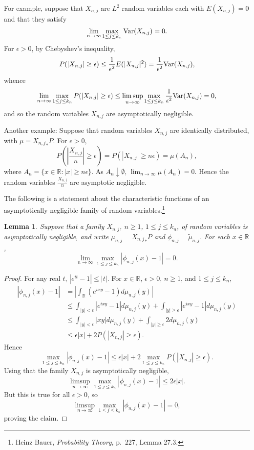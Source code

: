 \documentclass{article}
\newcommand{\Var}{\ensuremath\mathrm{Var}}
\newtheorem{lemma}[theorem]{Lemma}
\theoremstyle{definition}
\begin{document}
For example, suppose that $X_{n,j}$ are $L^2$ random variables each with $E(X_{n,j})=0$ and that they satisfy
\[
\lim_{n \to \infty} \max_{1 \leq j \leq k_n} \Var(X_{n,j}) = 0.
\]
For $\epsilon>0$, by Chebyshev's inequality,
\[
P(|X_{n,j}| \geq \epsilon) \leq \frac{1}{\epsilon^2} E(|X_{n,j}|^2)
=\frac{1}{\epsilon^2} \Var(X_{n,j}),
\]
whence
\[
\lim_{n \to \infty} \max_{1 \leq j \leq k_n} P(|X_{n,j}| \geq \epsilon)
\leq \limsup_{n \to \infty} \max_{1 \leq j \leq k_n} \frac{1}{\epsilon^2} \Var(X_{n,j})
=0,
\]
and so the random variables $X_{n,j}$ are asymptotically negligible.

Another example: Suppose that random variables $X_{n,j}$ are identically distributed,
with $\mu={X_{n,j}}_*P$.
For $\epsilon>0$,
\[
P\left(\left|\frac{X_{n,j}}{n} \right| \geq \epsilon \right)
=P(|X_{n,j}| \geq n\epsilon)
=\mu(A_n),
\]
where $A_n=\{x \in \mathbb{R}: |x| \geq n\epsilon\}$. As $A_n \downarrow \emptyset$,
$\lim_{n \to \infty} \mu(A_n) = 0$. Hence
the random variables $\frac{X_{n,j}}{n}$ are asymptotic negligible.

The following is a statement about the characteristic functions of an asymptotically negligible
family of random variables.\footnote{Heinz Bauer, {\em Probability Theory}, p.~227, Lemma 27.3.}

\begin{lemma}
Suppose that a family $X_{n,j}$, $n \geq 1$, $1 \leq j \leq k_n$, of random variables
is asymptotically negligible,
and write $\mu_{n,j}={X_{n,j}}_*P$ and $\phi_{n,j} = \tilde{\mu}_{n,j}$.
For each $x \in \mathbb{R}$,
\[
\lim_{n \to \infty} \max_{1 \leq j \leq k_n} |\phi_{n,j}(x)-1| = 0.
\]
\end{lemma}
\begin{proof}
For any real $t$, $|e^{it}-1| \leq |t|$. For $x \in \mathbb{R}$, $\epsilon>0$, $n \geq 1$,  and $1 \leq j \leq k_n$,
\begin{align*}
|\phi_{n,j}(x)-1|&=\left|\int_\mathbb{R} (e^{ixy}-1) d\mu_{n,j}(y) \right|\\
&\leq \int_{|y|<\epsilon} |e^{ixy}-1| d\mu_{n,j}(y)
+\int_{|y| \geq \epsilon} |e^{ixy}-1| d\mu_{n,j}(y)\\
&\leq \int_{|y|<\epsilon} |xy| d\mu_{n,j}(y)+\int_{|y| \geq \epsilon} 2 d\mu_{n,j}(y)\\
&\leq \epsilon |x| + 2 P(|X_{n,j}| \geq \epsilon).
\end{align*}
Hence
\[
\max_{1 \leq j \leq k_n} |\phi_{n,j}(x)-1| \leq \epsilon |x| + 2\max_{1 \leq j \leq k_n} P(|X_{n,j}| \geq \epsilon).
\]
Using that the family $X_{n,j}$ is asymptotically negligible,
\[
\limsup_{n \to \infty} \max_{1 \leq j \leq k_n} |\phi_{n,j}(x)-1| \leq 2\epsilon |x|.
\]
But this is true for all $\epsilon>0$, so
\[
\limsup_{n \to \infty} \max_{1 \leq j \leq k_n} |\phi_{n,j}(x)-1|  = 0,
\]
proving the claim.
\end{proof}
\end{document}
